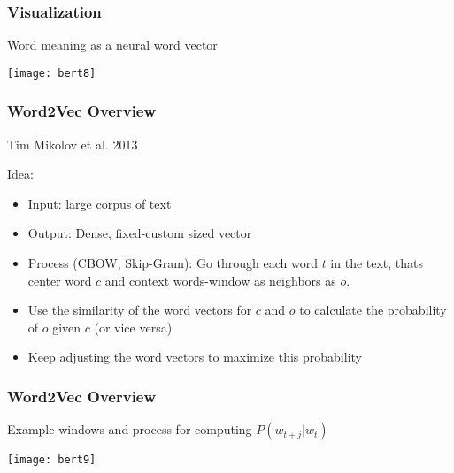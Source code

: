 \begin{frame}[fragile]\frametitle{Visualization}
Word meaning as a neural word vector
	  
\begin{center}
\texttt{[image: bert8]}
\end{center}		  
		


\end{frame}

\begin{frame}[fragile]\frametitle{Word2Vec Overview}
Tim Mikolov et al. 2013

Idea:
\begin{itemize}
\item Input: large corpus of text
\item Output: Dense, fixed-custom sized vector
\item Process (CBOW, Skip-Gram): Go through each word $t$ in the text, thats center word $c$ and context words-window as neighbors as $o$.
\item Use the similarity of the word vectors for $c$ and $o$ to calculate the probability of $o$ given $c$ (or vice versa)
\item Keep adjusting the word vectors to maximize this probability

\end{itemize}


\end{frame}

\begin{frame}[fragile]\frametitle{Word2Vec Overview}
Example windows and process for computing  $P(w_{t+j}|w_t)$


\begin{center}
\texttt{[image: bert9]}
\end{center}	


\end{frame}

